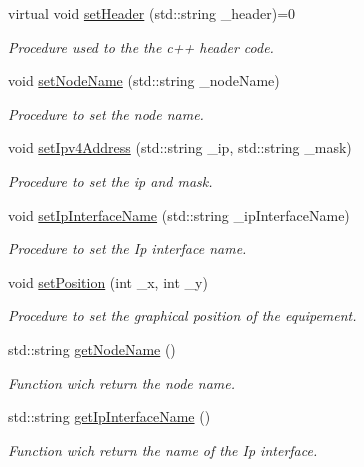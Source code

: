 \begin{CompactItemize}
virtual void \hyperlink{class_equipement_9068d14ff2c67d06be75a21ebc9fbcd7}{setHeader} (std::string \_\-header)=0
\begin{CompactList}\small\item\em Procedure used to the the c++ header code. \item\end{CompactList}\item 
void \hyperlink{class_equipement_a3d502e4f5b4292e87ff33ca15801897}{setNodeName} (std::string \_\-nodeName)
\begin{CompactList}\small\item\em Procedure to set the node name. \item\end{CompactList}\item 
void \hyperlink{class_equipement_ff68b70ae1942fca75462d78194cd443}{setIpv4Address} (std::string \_\-ip, std::string \_\-mask)
\begin{CompactList}\small\item\em Procedure to set the ip and mask. \item\end{CompactList}\item 
void \hyperlink{class_equipement_cea2da7dead8d0b74c90933c422211c4}{setIpInterfaceName} (std::string \_\-ipInterfaceName)
\begin{CompactList}\small\item\em Procedure to set the Ip interface name. \item\end{CompactList}\item 
void \hyperlink{class_equipement_70bc8e8f1b9527a9c54f4ac6bd93a2c7}{setPosition} (int \_\-x, int \_\-y)
\begin{CompactList}\small\item\em Procedure to set the graphical position of the equipement. \item\end{CompactList}\item 
std::string \hyperlink{class_equipement_4ab70e59e11de8b7f8af99d06409b032}{getNodeName} ()
\begin{CompactList}\small\item\em Function wich return the node name. \item\end{CompactList}\item 
std::string \hyperlink{class_equipement_a603e0547ea7c1b7f10757226100e1cc}{getIpInterfaceName} ()
\begin{CompactList}\small\item\em Function wich return the name of the Ip interface. \item\end{CompactList}\item 

\end{CompactItemize}
